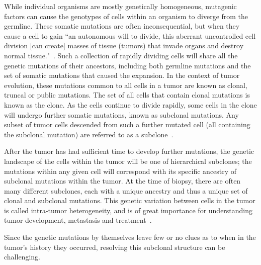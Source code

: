 \documentclass[../../main.tex]{subfiles}
\begin{document}
While individual organisms are mostly genetically homogeneous, mutagenic factors can cause the genotypes of cells within an organism to diverge from the germline.
These somatic mutations are often inconsequential, but when they cause a cell to gain ``an autonomous will to divide, this aberrant uncontrolled cell division [can create] masses of tissue (tumors) that invade organs and destroy normal tissue."~\cite{EmperorMaladies}. 
Such a collection of rapidly dividing cells will share all the genetic mutations of their ancestors, including both germline mutations and the set of somatic mutations that caused the expansion.
In the context of tumor evolution, these mutations common to all cells in a tumor are known as clonal, truncal or public mutations.
The set of all cells that contain clonal mutations is known as the clone.
As the cells continue to divide rapidly, some cells in the clone will undergo further somatic mutations, known as subclonal mutations.
Any subset of tumor cells descended from such a further mutated cell (all containing the subclonal mutation) are referred to as a subclone~\cite{bigbang, 21breasts, metastatic}.

After the tumor has had sufficient time to develop further mutations, the genetic landscape of the cells within the tumor will be one of hierarchical subclones; the mutations within any given cell will correspond with its specific ancestry of subclonal mutations within the tumor.
At the time of biopsy, there are often many different subclones, each with a unique ancestry and thus a unique set of clonal and subclonal mutations.
This genetic variation between cells in the tumor is called intra-tumor heterogeneity, and is of great importance for understanding tumor development, metastasis and treatment~\cite{metastatic, 21breasts, greaves2012clonal, merlo2006cancer}.

Since the genetic mutations by themselves leave few or no clues as to when in the tumor's history they occurred, resolving this subclonal structure can be challenging.

\end{document}
